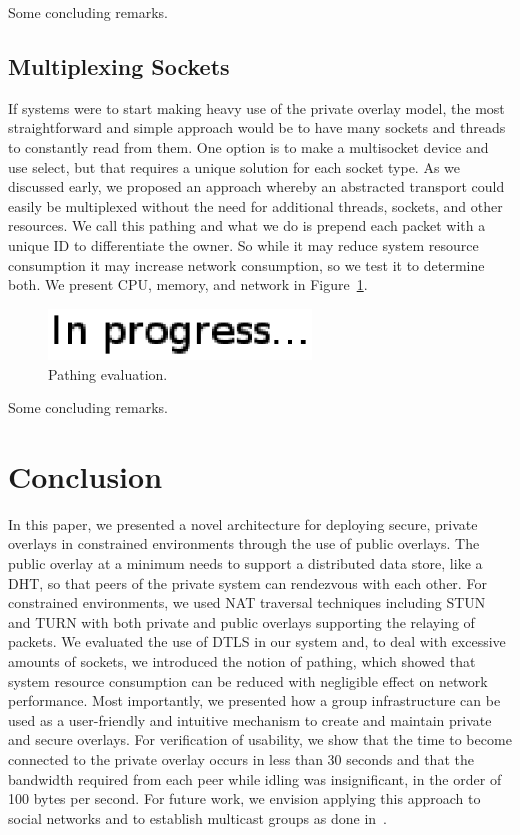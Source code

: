\documentclass[conference]{IEEEtran}
\begin{document}
Some concluding remarks.

\subsection{Multiplexing Sockets}
\label{pathing_evaluation}
If systems were to start making heavy use of the private overlay model, the most
straightforward and simple approach would be to have many sockets and threads to
constantly read from them.  One option is to make a multisocket device and use
select, but that requires a unique solution for each socket type.  As we
discussed early, we proposed an approach whereby an abstracted transport could
easily be multiplexed without the need for additional threads, sockets, and other
resources.  We call this pathing and what we do is prepend each packet with a
unique ID to differentiate the owner.  So while it may reduce system resource
consumption it may increase network consumption, so we test it to determine both.
We present CPU, memory, and network in Figure~\ref{fig:pathing_eval}.

\begin{figure}[h]
\centering
\includegraphics[width=2.75in]{in_progress.eps}
\caption{Pathing evaluation.}
\label{fig:pathing_eval}
\end{figure}

Some concluding remarks.

\section{Conclusion}
\label{conclusions}
In this paper, we presented a novel architecture for deploying secure, private
overlays in constrained environments through the use of public overlays.
The public overlay at a minimum needs to support a distributed data store,
like a DHT, so that peers of the private system can rendezvous with each other.
For constrained environments, we used NAT traversal techniques including STUN and
TURN with both private and public overlays supporting the relaying of packets.
We evaluated the use of DTLS in our system and, to deal with excessive amounts of
sockets, we introduced the notion of pathing, which showed that system resource
consumption can be reduced with negligible effect on network performance.  Most
importantly, we presented how a group infrastructure can be used as a user-friendly
and intuitive mechanism to create and maintain private and secure overlays.  
For verification of usability, we show that the time to become connected to the
private overlay occurs in less than 30 seconds and that the bandwidth required 
from each peer while idling was insignificant, in the order of 100 bytes per
second.  For future work, we envision applying this approach to social networks
and to establish multicast groups as done in~\cite{can}.



\suppressfloats
\end{document}

